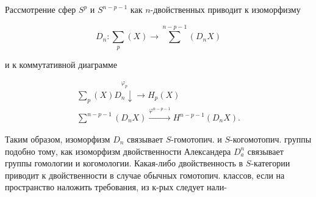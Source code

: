\documentclass[10pt]{article}
\begin{document}
Рассмотрение сфер $S^{p}$ и $S^{n-p-1}$ как $n$-двойственных приводит к изоморфизму



\[

D_{n}: \sum_{p}(X) \rightarrow \sum^{n-p-1}\left(D_{n} X\right)

\]



и к коммутативной диаграмме



\[

\begin{gathered}

\sum_{p}(X) \stackrel{\varphi_{p}}{D_{n} \downarrow} \rightarrow H_{p}(X) \\

\sum^{n-p-1}\left(D_{n} X\right) \stackrel{\varphi^{n-p-1}}{\longrightarrow} H^{n-p-1}\left(D_{n} X\right) .

\end{gathered}

\]



Таким образом, изоморфизм $D_{n}$ связывает $S$-гомотопич. и $S$-когомотопич. группы подобно тому, как изоморфизм двойственности Александера $D_{a}^{n}$ связывает группы гомологии и когомологии. Какая-либо двойственность в $S$-категории приводит к двойственности в случае обычных гомотопич. классов, если на пространство наложить требования, из к-рых следует нали-
\end{document}
